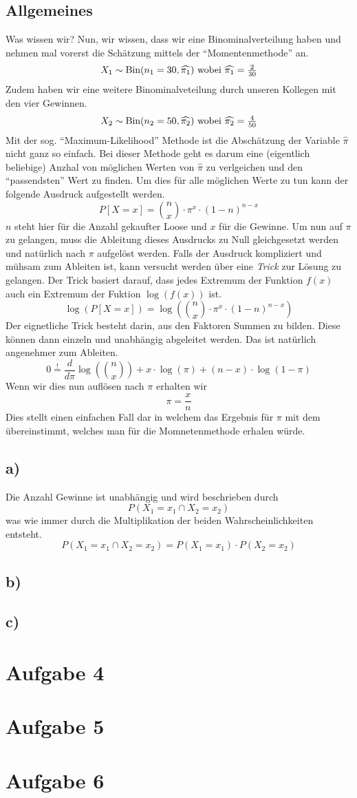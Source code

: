 \subsection*{Allgemeines}
Was wissen wir? Nun, wir wissen, dass wir eine Binominalverteilung haben
und nehmen mal vorerst die Schätzung mittels der ``Momentenmethode'' an. 
\[X_1 \sim \text{Bin}(n_1=30, \widehat{\pi_1})$ 
  wobei $\widehat{\pi_1} = \frac{2}{30}\]
Zudem haben wir eine weitere Binominalveteilung durch unseren Kollegen mit
den vier Gewinnen.
\[X_2 \sim \text{Bin}(n_2=50, \widehat{\pi_2})$ 
  wobei $\widehat{\pi_2} = \frac{4}{50}\]
Mit der sog. ``Maximum-Likelihood'' Methode ist die Abschätzung der
Variable $\widehat{\pi}$ nicht ganz so einfach. Bei dieser Methode geht
es darum eine (eigentlich beliebige) Anzhal von möglichen Werten von 
$\widehat{\pi}$ zu verlgeichen und den ``passendsten'' Wert zu finden.
Um dies für alle möglichen Werte zu tun kann der folgende Ausdruck aufgestellt
werden.
\[  P[X=x] = {n \choose x} \cdot \pi^x \cdot (1-n)^{n-x} \]
$n$ steht hier für die Anzahl gekaufter Loose und $x$ für die Gewinne.
Um nun auf $\pi$ zu gelangen, muss die Ableitung dieses Ausdrucks zu Null
gleichgesetzt werden und natürlich nach $\pi$ aufgelöst werden.
Falls der Ausdruck kompliziert und mühsam zum Ableiten ist, kann versucht 
werden über eine \emph{Trick} zur Lösung zu gelangen. Der Trick basiert
darauf, dass jedes Extremum der Funktion $f(x)$ auch ein Extremum der 
Fuktion $\log(f(x))$ ist.
\[ \log\left(P[X=x]\right) = 
   \log\left({n \choose x} \cdot \pi^x \cdot (1-n)^{n-x}\right) \]
Der eignetliche Trick besteht darin, aus den Faktoren Summen zu bilden.
Diese können dann einzeln und unabhängig abgeleitet werden. Das ist natürlich
angenehmer zum Ableiten.
\[ 0 \stackrel{!}{=} \frac{d}{d\pi} \log\left( {n \choose x} \right) +
   x \cdot \log( \pi ) + (n-x)\cdot \log(1-\pi) \]
Wenn wir dies nun auflösen nach $\pi$ erhalten wir
\[ \pi = \frac{x}{n} \]
Dies stellt einen einfachen Fall dar in welchem das Ergebnis für $\pi$
mit dem übereinstimmt, welches man für die Momnetenmethode erhalen würde.

\subsection*{a)}
Die Anzahl Gewinne ist unabhängig und wird beschrieben durch
\[ P(X_1 = x_1 \cap X_2 = x_2 ) \]
was wie immer durch die Multiplikation der beiden Wahrscheinlichkeiten
entsteht.
\[ P(X_1 = x_1 \cap X_2 = x_2 ) = P(X_1 = x_1) \cdot P(X_2=x_2) \]

\subsection*{b)}
\subsection*{c)}


\section{Aufgabe 4}
\section{Aufgabe 5}
\section{Aufgabe 6}
